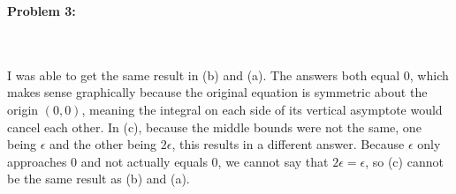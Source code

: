 \documentclass[11pt]{article}
\newenvironment{problem}[1]{\textbf{Problem #1: }}{\newpage}
\begin{document}
\begin{problem}{3}
\begin{enumerate}[label = (\alph*)]
			\\ \\
			I was able to get the same result in (b) and (a).  The answers both equal 0, which makes sense graphically because the original equation is symmetric about the origin $(0,0)$, meaning the integral on each side of its vertical asymptote would cancel each other.  In (c), because the middle bounds were not the same, one being $\epsilon$ and the other being $2\epsilon$, this results in a different answer.  Because $\epsilon$ only approaches 0 and not actually equals 0, we cannot say that $2\epsilon = \epsilon$, so (c) cannot be the same result as (b) and (a).
		 \end{enumerate}
	\end{problem}
\end{document}
